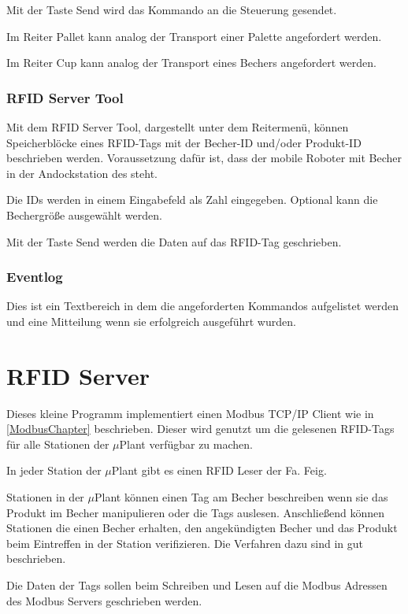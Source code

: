 Mit der Taste \glqq Send\grqq{} wird das Kommando an die Steuerung gesendet.

Im Reiter \glqq Pallet\grqq{} kann analog der Transport einer Palette angefordert werden.

Im Reiter \glqq Cup\grqq{} kann analog der Transport eines Bechers angefordert werden.

\subsubsection{RFID Server Tool}

Mit dem RFID Server Tool, dargestellt unter dem Reitermenü, können Speicherblöcke eines RFID-Tags mit der Becher-ID und/oder Produkt-ID
beschrieben werden.
Voraussetzung dafür ist, dass der mobile Roboter mit Becher in der Andockstation des steht.

Die IDs werden in einem Eingabefeld als Zahl eingegeben. Optional kann die Bechergröße ausgewählt werden. 

Mit der Taste \glqq Send\grqq{} werden die Daten auf das RFID-Tag geschrieben.

\subsubsection{Eventlog}

Dies ist ein Textbereich in dem die angeforderten Kommandos aufgelistet werden und eine Mitteilung wenn sie erfolgreich ausgeführt wurden.


\clearpage
\section {RFID Server}

Dieses kleine Programm implementiert einen Modbus TCP/IP Client wie in \ref{ModbusChapter} beschrieben.
Dieser wird genutzt um die gelesenen RFID-Tags für alle Stationen der $\mu$Plant verfügbar zu machen.

In jeder Station der $\mu$Plant gibt es einen RFID Leser der Fa. Feig.

Stationen in der $\mu$Plant können einen Tag am Becher beschreiben wenn sie das Produkt im Becher manipulieren oder die Tags auslesen.
Anschließend können Stationen die einen Becher erhalten, den angekündigten Becher und das Produkt beim Eintreffen
in der Station verifizieren.
Die Verfahren dazu sind in \cite{LarsKistner2017} gut beschrieben.

Die Daten der Tags sollen beim Schreiben und Lesen auf die Modbus Adressen des Modbus Servers geschrieben werden.

